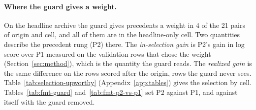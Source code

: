 \paragraph{Where the guard gives a weight.}
On the headline archive the guard gives precedents a weight in 4 of the 21 pairs of origin and cell, and all of them are in the headline-only cell. Two quantities describe the precedent rung (P2) there. The \emph{in-selection gain} is P2's gain in log score over P1 measured on the validation rows that chose the weight (Section~\ref{sec:method}), which is the quantity the guard reads. The \emph{realized gain} is the same difference on the rows scored after the origin, rows the guard never sees. Table~\ref{tab:selection-upworthy} (Appendix~\ref{app:tables}) gives the selection by cell. Tables~\ref{tab:fmt-guard} and~\ref{tab:fmt-p2-vs-p1} set P2 against P1, and against itself with the guard removed.

\begin{table}[t]\centering\scriptsize
\caption{The fitted prior (P1) set against the precedent rung (P2), which mixes the prior with a weighted mean of similar past contrasts, pooled on the headline archive. The columns are P1 and P2 with the guard on and with it off; the guard gives the precedents a weight only when they improve the log score on validation rows. Rows: the pairs of origin and cell in which precedents get a weight, the same count by cell out of the seven origins in each cell, the log score per row, and the Brier skill against the base rate.}
\label{tab:fmt-guard}
\resizebox{\columnwidth}{!}{%
}
\end{table}

